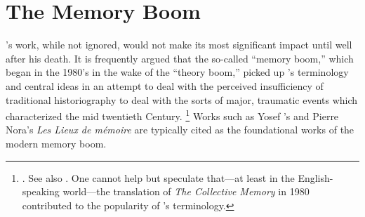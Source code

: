 
\section{The Memory Boom}

\halbwachs's work, while not ignored, would not make its most significant impact until well after his death. It is frequently argued that the so-called ``memory boom,'' which began in the 1980's in the wake of the ``theory boom,'' picked up \halbwachs's terminology and central ideas in an attempt to deal with the perceived insufficiency of traditional historiography to deal with the sorts of major, traumatic events which characterized the mid twentieth Century.%
%
\footnote{\cite[1--2]{galinsky_galinsky2016}. See also \cite[29--36]{olick_olick-etal2011}. One cannot help but speculate that---at least in the English-speaking world---the translation of \emph{The Collective Memory} in 1980 contributed to the popularity of \halbwachs's terminology.}
%
Works such as Yosef \yerushalmi's  and Pierre Nora's \emph{Les Lieux de mémoire} are typically cited as the foundational works of the modern memory boom.\autocites[112--113]{klein2011}{yerushalmi1989}[Nora's massive project has been abridged and translated into English as][]{nora1996}  

